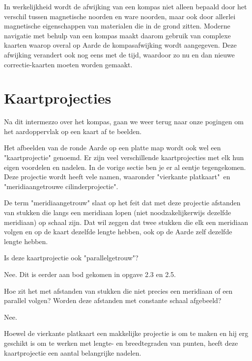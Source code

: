 In werkelijkheid wordt de afwijking van een kompas niet alleen bepaald door het verschil tussen magnetische noorden en ware noorden, maar ook door allerlei magnetische eigenschappen van materialen die in de grond zitten. Moderne navigatie met behulp van een kompas maakt daarom gebruik van complexe kaarten waarop overal op Aarde de kompasafwijking wordt aangegeven. Deze afwijking verandert ook nog eens met de tijd, waardoor zo nu en dan nieuwe correctie-kaarten moeten worden gemaakt.

\section{Kaartprojecties}

Na dit intermezzo over het kompas, gaan we weer terug naar onze pogingen om het aardoppervlak op een kaart af te beelden.

Het afbeelden van de ronde Aarde op een platte map wordt ook wel een "kaartprojectie" genoemd. Er zijn veel verschillende kaartprojecties met elk hun eigen voordelen en nadelen. In de vorige sectie ben je er al eentje tegengekomen. Deze projectie wordt heeft vele namen, waaronder "vierkante platkaart"\ en "meridiaangetrouwe cilinderprojectie".

De term "meridiaangetrouw" slaat op het feit dat met deze projectie afstanden van stukken die langs een meridiaan lopen (niet noodzakelijkerwijs dezelfde meridiaan) op schaal zijn. Dat wil zeggen dat twee stukken die elk een meridiaan volgen en op de kaart dezelfde lengte hebben, ook op de Aarde zelf dezelfde lengte hebben.

\begin{opgave}
	\begin{subopgave}
		Is deze kaartprojectie ook "parallelgetrouw"?
		\begin{antwoord}
			Nee. Dit is eerder aan bod gekomen in opgave 2.3 en 2.5.
		\end{antwoord}
	\end{subopgave}
	\begin{subopgave}
		Hoe zit het met afstanden van stukken die niet precies een meridiaan of een parallel volgen? Worden deze afstanden met constante schaal afgebeeld?
		\begin{antwoord}
			Nee.
		\end{antwoord}
	\end{subopgave}
\end{opgave}

Hoewel de vierkante platkaart een makkelijke projectie is om te maken en hij erg geschikt is om te werken met lengte- en breedtegraden van punten, heeft deze kaartprojectie een aantal belangrijke nadelen.


